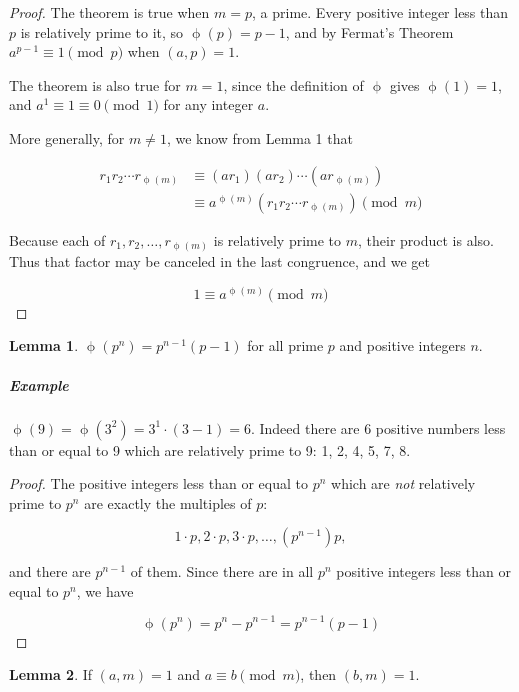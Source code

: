 \documentclass{article}
\theoremstyle{definition} %
\theoremstyle{definition}
\theoremstyle{definition}
\newtheorem{lemma}{Lemma}[section]
\newcommand{\tot}{\upphi}
\theoremstyle{definition}
\begin{document}
  \begin{proof}
    The theorem is true when $m = p$, a prime. Every positive integer less than $p$
    is relatively prime to it, so $\tot(p) = p - 1$, and by Fermat's Theorem $a^{p - 1} \equiv 1
    \pmod{p}$ when $(a, p) = 1$.
    
    The theorem is also true for $m = 1$, since the definition of $\tot$ gives $\tot(1) = 1$,
    and $a^1 \equiv 1 \equiv 0 \pmod{1}$ for any integer $a$.
    
    More generally, for $m \neq 1$, we know from Lemma 1 that
    
    \begin{align*}
      r_1r_2\cdots r_{\tot(m)} &\equiv (ar_1)(ar_2)\cdots (ar_{\tot(m)}) \\
      &\equiv a^{\tot(m)}(r_1r_2\cdots r_{\tot(m)}) \pmod{m}
    \end{align*}
    
    Because each of $r_1, r_2, \dots, r_{\tot(m)}$ is relatively prime to $m$, their product is also.
    Thus that factor may be canceled in the last congruence, and we get
    
    \[ 1 \equiv a^{\tot(m)} \pmod{m} \]
  \end{proof}
  
  \begin{lemma}
    $\tot(p^n) = p^{n-1}(p - 1)$ for all prime $p$ and positive integers $n$.
    \label{lem:totient_prime}
  \end{lemma}
  
  \subparagraph{Example} $\tot(9) = \tot(3^2) = 3^1\cdot(3-1) = 6$. Indeed there are 6 positive
  numbers less than or equal to 9 which are relatively prime to 9: 1, 2, 4, 5, 7, 8.
  
  \begin{proof}
    The positive integers less than or equal to $p^n$ which are \textit{not} relatively prime
    to $p^n$ are exactly the multiples of $p$:
    
    \[
      1\cdot p, 2\cdot p, 3\cdot p, \dots, (p^{n-1})p,
    \]
    
    and there are $p^{n-1}$ of them. Since there are in all $p^n$ positive integers less than
    or equal to $p^n$, we have
    
    \[
      \tot(p^n) = p^n - p^{n-1} = p^{n - 1}(p - 1)
    \]
  \end{proof}
  
  \begin{lemma}
    If $(a, m) = 1$ and $a \equiv b \pmod{m}$, then $(b, m) = 1$.
  \end{lemma}
  
\end{document}
